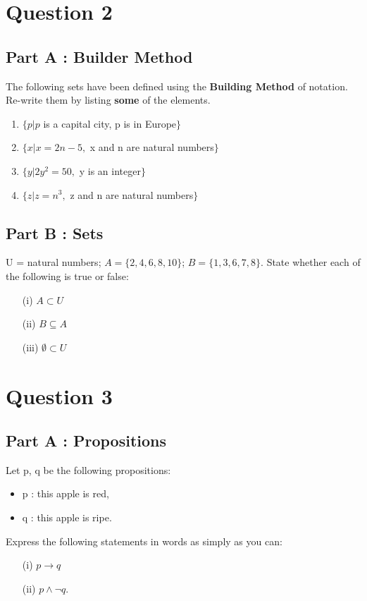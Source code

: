 \documentclass[12pt]{report}
\begin{document}
\section*{Question 2}
\subsection*{Part A : Builder Method}
The following sets have been defined using the \textbf{Building Method} of notation. Re-write them by listing \textbf{some} of the elements.
\begin{enumerate}
\item $\{p | p$ is a capital city, p is in Europe$\}$
\item $\{x | x = 2n - 5,$ x and n are natural numbers$\}$
\item $\{y | 2y^2 = 50,$ y is an integer$\}$
\item $\{z | z = n^3,$ z and n are natural numbers$\}$
\end{enumerate}
\subsection*{Part B : Sets}
U = {natural numbers}; $A = \{2, 4, 6, 8, 10\}$; $B = \{1, 3, 6, 7, 8\}$. State whether each of the following is true or false:
\begin{itemize}
\item[(i)] $A \subset U$
\item[(ii)] $B \subseteq A$
\item[(iii)] $\emptyset \subset U$
\end{itemize}


\section*{Question 3}
\subsection*{Part A : Propositions}
Let p, q be the following propositions:
\begin{itemize}
\item p : this apple is red, 
\item q : this apple is ripe.
\end{itemize}

\noindent Express the following statements in words as simply as you can:
\begin{itemize}
\item[(i)] $p \rightarrow q$
\item[(ii)] $p \wedge \neg q$.
\end{itemize}
 
\end{document}
